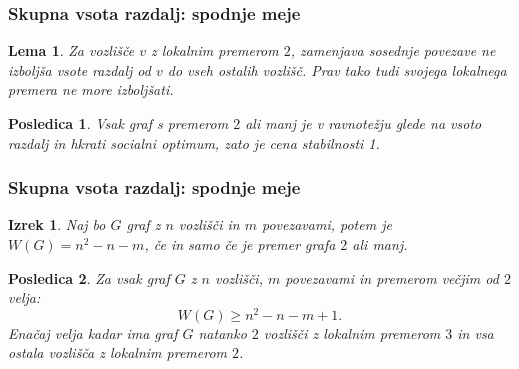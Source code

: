 \documentclass[12pt, hyperref={unicode}]{beamer}
\newtheorem{izrek}{Izrek}
\newtheorem{posledica}{Posledica}
\newtheorem{lema}{Lema}
\begin{document}
\begin{frame}
  
  \frametitle{Skupna vsota razdalj: spodnje meje}
  \begin{lema}
    Za vozlišče $v$ z lokalnim premerom $2$, zamenjava sosednje povezave ne izboljša
    vsote razdalj od $v$ do vseh ostalih vozlišč. Prav tako tudi svojega lokalnega premera ne more izboljšati.
  \end{lema}
  \begin{posledica}
    Vsak graf s premerom $2$ ali manj je v \textit{ravnotežju glede na vsoto razdalj}
    in hkrati socialni optimum, zato je cena stabilnosti 1.
  \end{posledica}
  
\end{frame}


\begin{frame}
  
  \frametitle{Skupna vsota razdalj: spodnje meje}
  \begin{izrek}
    Naj bo $G$ graf z $n$ vozlišči in $m$ povezavami, potem je $W(G) = n^2 - n - m$, če in samo če je premer grafa $2$ ali manj.
  \end{izrek}
  \begin{posledica}
    Za vsak graf $G$ z $n$ vozlišči, $m$ povezavami in premerom večjim od $2$ velja:
    $$W(G) \geq n^2 - n - m + 1.$$
    Enačaj velja kadar ima graf $G$ natanko $2$ vozlišči z lokalnim premerom $3$ in vsa ostala vozlišča z lokalnim premerom $2$.
  \end{posledica}
  
\end{frame}

\end{document}
